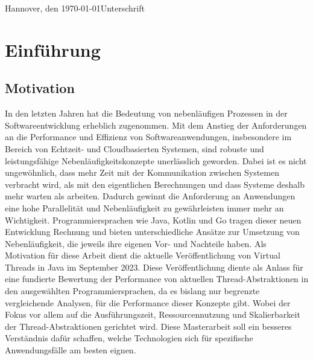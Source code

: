 \documentclass[fontsize=12pt,paper=a4,twoside=semi,parskip=half-,headsepline,headinclude]{scrreprt}
\begin{document}
Hannover, den \today \hfill Unterschrift


\newpage 
\thispagestyle{empty}
\quad 
\newpage


\tableofcontents  %

\listoffigures      %

\listoftables       %

\newpage


\chapter{Einführung}

\section{Motivation}

In den letzten Jahren hat die Bedeutung von nebenläufigen Prozessen in der Softwareentwicklung erheblich zugenommen. Mit dem Anstieg der Anforderungen an die Perfor\-mance und Effizienz von Softwareanwendungen, insbesondere im Bereich von Echtzeit- und Cloud\-basierten Systemen, sind robuste und leistungsfähige Nebenläufigkeits\-kon\-zep\-te unerlässlich geworden. Dabei ist es nicht ungewöhnlich, dass mehr Zeit mit der Kommunikation zwischen Systemen verbracht wird, als mit den eigentlichen Berechnungen und dass Systeme deshalb mehr warten als arbeiten. Dadurch gewinnt die Anforderung an Anwendungen eine hohe Parallelität und Nebenläufigkeit zu gewährleisten immer mehr an Wichtigkeit. Programmiersprachen wie Java, Kotlin und Go tragen dieser neuen Entwicklung Rechnung und bieten unterschiedliche Ansätze zur Umsetzung von Nebenläufigkeit, die jeweils ihre eigenen Vor- und Nachteile haben. Als Motivation für diese Arbeit dient die aktuelle Veröffentlichung von Virtual Threads in Java im September 2023. Diese Veröffentlichung diente als Anlass für eine fundierte Bewertung der Performance von aktuellen Thread-Abstraktionen in den ausgewählten Programmiersprachen, da es bislang nur begrenzte vergleichende Analysen, für die Performance dieser Konzepte gibt. Wobei der Fokus vor allem auf die Ausführungszeit, Ressourcennutzung und Skalierbarkeit der Thread-Abstraktionen gerichtet wird. Diese Masterarbeit soll ein besseres Verständnis dafür schaffen, welche Technologien sich für spezifische Anwendungsfälle am besten eignen.
\end{document}
